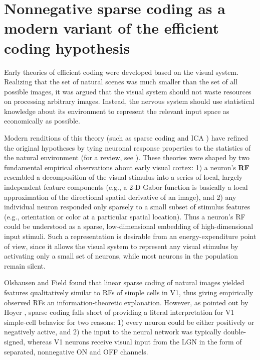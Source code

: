 \section{Nonnegative sparse coding as a modern variant of the efficient coding hypothesis}

Early theories of efficient coding
\citep{Barlow1961,Attneave1954}
were developed based on the visual system.
Realizing that the set of natural scenes was much smaller
than the set of all possible images,
it was argued that the visual system should not 
waste  resources on processing arbitrary images.
Instead, the nervous system should use statistical knowledge
about its environment to represent the relevant input space 
as economically as possible.

Modern renditions of this theory
(such as sparse coding \citep{OlshausenField1996} and
\ac{ICA} \citep{BellSejnowski1997})
have refined the original hypotheses
by tying neuronal response properties 
to the statistics of the natural environment
(for a review, see \cite{SimoncelliOlshausen2001}).
These theories were shaped by two
fundamental empirical observations
about early visual cortex:
1) a neuron's \textbf{\ac{RF}} resembled a decomposition of the visual
stimulus into a series of local, largely independent feature components
(e.g., a 2-D Gabor function is basically a local approximation of the
directional spatial derivative of an image),
and 2) any individual neuron responded only sparsely to a small subset of
stimulus features (e.g., orientation or color at a particular spatial location).
Thus a neuron's \ac{RF} could be understood as a
sparse, low-dimensional embedding of high-dimensional input stimuli.
Such a representation is desirable from an energy-expenditure point of view,
since it allows the visual system to represent
any visual stimulus by activating only a small set of neurons,
while most neurons in the population remain silent.

Olshausen and Field \citep{OlshausenField1996} found that
linear sparse coding of natural images
yielded features qualitatively similar to
\acp{RF} of simple cells in \ac{V1},
thus giving empirically observed \acp{RF} an information-theoretic explanation.
However, as pointed out by Hoyer \citep{Hoyer2003}, sparse coding falls short
of providing a literal interpretation for \ac{V1} simple-cell behavior
for two reasons:
1) every neuron could be either positively or negatively active,
and 2) the input to the neural network was typically double-signed,
whereas \ac{V1} neurons receive visual input from the \ac{LGN} in the form of
separated, nonnegative ON and OFF channels.

